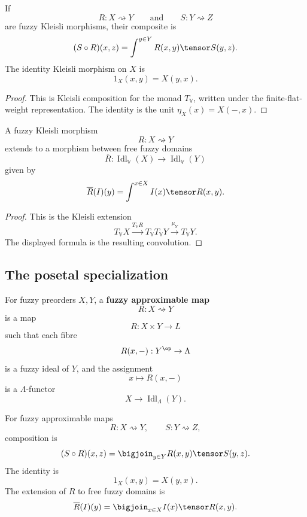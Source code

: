 \begin{proposition}
\label{prop:kleisli-composition-enriched}
If
\[
    R:X\rightsquigarrow Y
    \qquad\text{and}\qquad
    S:Y\rightsquigarrow Z
\]
are fuzzy Kleisli morphisms, their composite is
\[
    (S\circ R)(x,z)
    =
    \int^{y\in Y}R(x,y)\tensor S(y,z).
\]
The identity Kleisli morphism on \(X\) is
\[
    1_X(x,y)=X(y,x).
\]
\end{proposition}

\begin{proof}
This is Kleisli composition for the monad \(T_{\mathbb V}\), written under the
finite-flat-weight representation.  The identity is the unit
\(\eta_X(x)=X(-,x)\).
\end{proof}

\begin{proposition}
\label{prop:kleisli-extension-free-domain}
A fuzzy Kleisli morphism
\[
    R:X\rightsquigarrow Y
\]
extends to a morphism between free fuzzy domains
\[
    \overline R:
    \operatorname{Idl}_{\mathbb V}(X)
    \to
    \operatorname{Idl}_{\mathbb V}(Y)
\]
given by
\[
    \overline R(I)(y)
    =
    \int^{x\in X} I(x)\tensor R(x,y).
\]
\end{proposition}

\begin{proof}
This is the Kleisli extension
\[
    T_{\mathbb V}X
    \xrightarrow{T_{\mathbb V}R}
    T_{\mathbb V}T_{\mathbb V}Y
    \xrightarrow{\mu_Y}
    T_{\mathbb V}Y.
\]
The displayed formula is the resulting convolution.
\end{proof}

\subsection{The posetal specialization}
\label{subsec:kleisli-posetal}

\begin{definition}
\label{def:fuzzy-approximable-map}
For fuzzy preorders \(X,Y\), a \textbf{fuzzy approximable map}
\[
    R:X\rightsquigarrow Y
\]
is a map
\[
    R:X\times Y\to L
\]
such that each fibre
\[
    R(x,-):Y^{\op}\to\Lambda
\]
is a fuzzy ideal of \(Y\), and the assignment
\[
    x\longmapsto R(x,-)
\]
is a \(\Lambda\)-functor
\[
    X\to\operatorname{Idl}_\Lambda(Y).
\]
\end{definition}

\begin{proposition}
\label{prop:posetal-kleisli-formulas}
For fuzzy approximable maps
\[
    R:X\rightsquigarrow Y,
    \qquad
    S:Y\rightsquigarrow Z,
\]
composition is
\[
    (S\circ R)(x,z)
    =
    \bigjoin_{y\in Y}R(x,y)\tensor S(y,z).
\]
The identity is
\[
    1_X(x,y)=X(y,x).
\]
The extension of \(R\) to free fuzzy domains is
\[
    \overline R(I)(y)
    =
    \bigjoin_{x\in X}I(x)\tensor R(x,y).
\]
\end{proposition}

